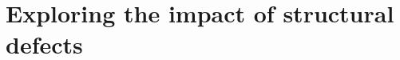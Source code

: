 
\graphicspath{ {\thisch/figures/} }

\chapter{Exploring the impact of structural defects}%
\label{def}








